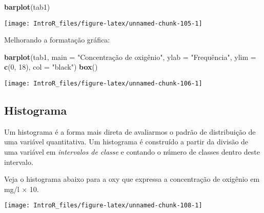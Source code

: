 \documentclass[
]{book}
\newenvironment{Shaded}{\begin{snugshade}}{\end{snugshade}}
\newcommand{\DataTypeTok}[1]{\textcolor[rgb]{0.13,0.29,0.53}{#1}}
\newcommand{\DecValTok}[1]{\textcolor[rgb]{0.00,0.00,0.81}{#1}}
\newcommand{\KeywordTok}[1]{\textcolor[rgb]{0.13,0.29,0.53}{\textbf{#1}}}
\newcommand{\NormalTok}[1]{#1}
\newcommand{\OperatorTok}[1]{\textcolor[rgb]{0.81,0.36,0.00}{\textbf{#1}}}
\newcommand{\StringTok}[1]{\textcolor[rgb]{0.31,0.60,0.02}{#1}}
\begin{document}
\begin{Shaded}
\begin{Highlighting}[]
\KeywordTok{barplot}\NormalTok{(tab1)}
\end{Highlighting}
\end{Shaded}

\begin{center}\texttt{[image: IntroR\_files/figure-latex/unnamed-chunk-105-1]} \end{center}

Melhorando a formatação gráfica:

\begin{Shaded}
\begin{Highlighting}[]
\KeywordTok{barplot}\NormalTok{(tab1,}
        \DataTypeTok{main =} \StringTok{"Concentração de oxigênio",}
\StringTok{        ylab = "}\NormalTok{Frequência",}
        \DataTypeTok{ylim =} \KeywordTok{c}\NormalTok{(}\DecValTok{0}\NormalTok{, }\DecValTok{18}\NormalTok{), }\DataTypeTok{col =} \StringTok{"black"}\NormalTok{)}
\KeywordTok{box}\NormalTok{()}
\end{Highlighting}
\end{Shaded}

\begin{center}\texttt{[image: IntroR\_files/figure-latex/unnamed-chunk-106-1]} \end{center}

\hypertarget{histograma}{%
\subsection{Histograma}\label{histograma}}

Um histograma é a forma mais direta de avaliarmos o padrão de distribuição de uma variável quantitativa. Um histograma é construído a partir da divisão de uma variável em \emph{intervalos de classe} e contando o número de classes dentro deste intervalo.

Veja o histograma abaixo para a oxy que expressa a concentração de oxigênio em mg/l \(\times\) 10.

\begin{Shaded}
\end{Shaded}

\begin{center}\texttt{[image: IntroR\_files/figure-latex/unnamed-chunk-108-1]} \end{center}
\end{document}
